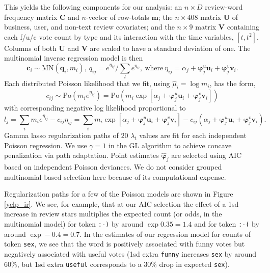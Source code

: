 \documentclass[12pt]{article}
\newcommand{\bs}[1]{\boldsymbol{#1}}
\newcommand{\mr}[1]{\mathrm{#1}}
\newcommand{\bm}[1]{\mathbf{#1}}
\newcommand{\cd}[1]{{\tt#1}}
\begin{document}
 
This yields the following components for our analysis:  an $n \times D$
review-word frequency matrix $\bm{C} $ and $n$-vector of row-totals  $\bm{m}$;
the $n \times 408$ matrix $\bm{U}$ of business, user, and non-text review
covariates; and the $n \times 9$ matrix $\bm{V}$ containing each f/u/c vote
count by type and its interaction with the time variables, $[t,t^2]$.  Columns of both
$\bm{U}$ and $\bm{V}$ are scaled to have a standard deviation of one. The
multinomial inverse regression model is then
\begin{equation}
\bm{c}_i \sim \mr{MN}(\bm{q}_i, m_i),~q_{ij} = e^{\eta_{ij}}/\sum_{l}e^{\eta_{il}},
~\text{where}~\eta_{ij} = \alpha_j + \bs{\varphi}_j^{u}\bm{u}_i + \bs{\varphi}_j^{v}\bm{v}_i.
\end{equation}
Each distributed Poisson likelihood that we fit, using $\hat\mu_i = \log m_i$, has the form,
\begin{equation}
c_{ij} \sim \mr{Po}\left(m_ie^{\eta_{ij}}\right) = 
\mr{Po}\left(m_i\exp[\alpha_j + \bs{\varphi}_j^{u}\bm{u}_i + \bs{\varphi}_j^{v}\bm{v}_i]\right)
\end{equation}
with corresponding negative log likelihood proportional to
\begin{equation}
l_j = \sum_i m_i e^{\eta_{ij}} - c_{ij} \eta_{ij} 
= \sum_i m_i \exp[\alpha_j + \bs{\varphi}_j^{u}\bm{u}_i + \bs{\varphi}_j^{v}\bm{v}_i]
- c_{ij}(\alpha_j + \bs{\varphi}_j^{u}\bm{u}_i + \bs{\varphi}_j^{v}\bm{v}_i).
\end{equation}
Gamma lasso regularization paths of $20$ $\lambda_t$ values are fit
 for each independent Poisson regression.  
We use $\gamma =1$ in the GL algorithm to achieve concave penalization via
path adaptation. Point estimates $\bs{\hat\varphi}_j$
are selected using AIC based on independent
Poisson deviances.  We do not consider grouped multinomial-based selection here because of its computational expense.


Regularization paths for a few of the Poisson models  are shown in Figure
\ref{yelp_ir}.  We see, for example, that at our AIC selection the effect of a
1sd increase in review stars multiplies the expected count (or odds, in the
multinomial model) for token \cd{:-)} by around $\exp 0.35 = 1.4$ and for
token \cd{:-(} by around $\exp -0.4 = 0.7$.  In the estimates of our
regression model for counts of token \cd{sex}, we see that the word is
positively associated with funny votes but negatively associated with useful
votes (1sd extra \cd{funny} increases \cd{sex} by around 60\%, but 1sd extra
\cd{useful} corresponds to a 30\% drop in expected \cd{sex}).
\end{document}
